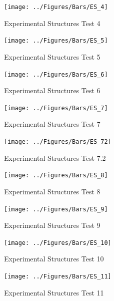 \documentclass[12pt,oneside]{book}
\begin{document}
\begin{figure}[!ht]
	\texttt{[image: ../Figures/Bars/ES\_4]}
	\caption{Experimental Structures Test 4}
	\label{fig:Experimental_Structures_Test_4}
\end{figure}

\clearpage

\begin{figure}[!ht]
	\texttt{[image: ../Figures/Bars/ES\_5]}
	\caption{Experimental Structures Test 5}
	\label{fig:Experimental_Structures_Test_5}
\end{figure}

\begin{figure}[!ht]
	\texttt{[image: ../Figures/Bars/ES\_6]}
	\caption{Experimental Structures Test 6}
	\label{fig:Experimental_Structures_Test_6}
\end{figure}

\begin{figure}[!ht]
	\texttt{[image: ../Figures/Bars/ES\_7]}
	\caption{Experimental Structures Test 7}
	\label{fig:Experimental_Structures_Test_7}
\end{figure}

\begin{figure}[!ht]
	\texttt{[image: ../Figures/Bars/ES\_72]}
	\caption{Experimental Structures Test 7.2}
	\label{fig:Experimental_Structures_Test_7.2}
\end{figure}

\clearpage

\begin{figure}[!ht]
	\texttt{[image: ../Figures/Bars/ES\_8]}
	\caption{Experimental Structures Test 8}
	\label{fig:Experimental_Structures_Test_8}
\end{figure}

\begin{figure}[!ht]
	\texttt{[image: ../Figures/Bars/ES\_9]}
	\caption{Experimental Structures Test 9}
	\label{fig:Experimental_Structures_Test_9}
\end{figure}

\begin{figure}[!ht]
	\texttt{[image: ../Figures/Bars/ES\_10]}
	\caption{Experimental Structures Test 10}
	\label{fig:Experimental_Structures_Test_10}
\end{figure}

\begin{figure}[!ht]
	\texttt{[image: ../Figures/Bars/ES\_11]}
	\caption{Experimental Structures Test 11}
	\label{fig:Experimental_Structures_Test_11}
\end{figure}
\end{document}
